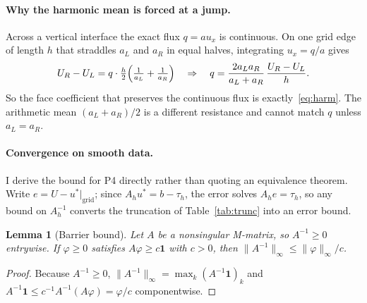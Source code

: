 \documentclass[11pt,a4paper]{article}
\newtheorem{lemma}{Lemma}
\begin{document}
\paragraph{Why the harmonic mean is forced at a jump.}
Across a vertical interface the exact flux \(q=a u_x\) is continuous.
On one grid edge of length \(h\) that straddles \(a_L\) and \(a_R\) in equal halves, integrating \(u_x=q/a\) gives
\begin{equation}
U_R-U_L
=q\cdot\tfrac{h}{2}\Bigl(\tfrac{1}{a_L}+\tfrac{1}{a_R}\Bigr)
\quad\Rightarrow\quad
q=\frac{2 a_L a_R}{a_L+a_R}\,\frac{U_R-U_L}{h}.
\label{eq:series}
\end{equation}
So the face coefficient that preserves the continuous flux is exactly~\eqref{eq:harm}.
The arithmetic mean \((a_L+a_R)/2\) is a different resistance and cannot match \(q\) unless \(a_L=a_R\).

\paragraph{Convergence on smooth data.}
I derive the bound for P4 directly rather than quoting an equivalence theorem.
Write \(e=U-u^*|_{\mathrm{grid}}\); since \(A_h u^*=b-\tau_h\), the error solves \(A_h e=\tau_h\), so any bound on \(A_h^{-1}\) converts the truncation of Table~\ref{tab:trunc} into an error bound.

\begin{lemma}[Barrier bound]\label{lem:barrier}
Let \(A\) be a nonsingular M-matrix, so \(A^{-1}\ge 0\) entrywise. If \(\varphi\ge 0\) satisfies \(A\varphi\ge c\mathbf{1}\) with \(c>0\), then \(\|A^{-1}\|_\infty\le\|\varphi\|_\infty/c\).
\end{lemma}
\begin{proof}
Because \(A^{-1}\ge 0\), \(\|A^{-1}\|_\infty=\max_k(A^{-1}\mathbf{1})_k\) and \(A^{-1}\mathbf{1}\le c^{-1}A^{-1}(A\varphi)=\varphi/c\) componentwise.
\end{proof}
\end{document}
